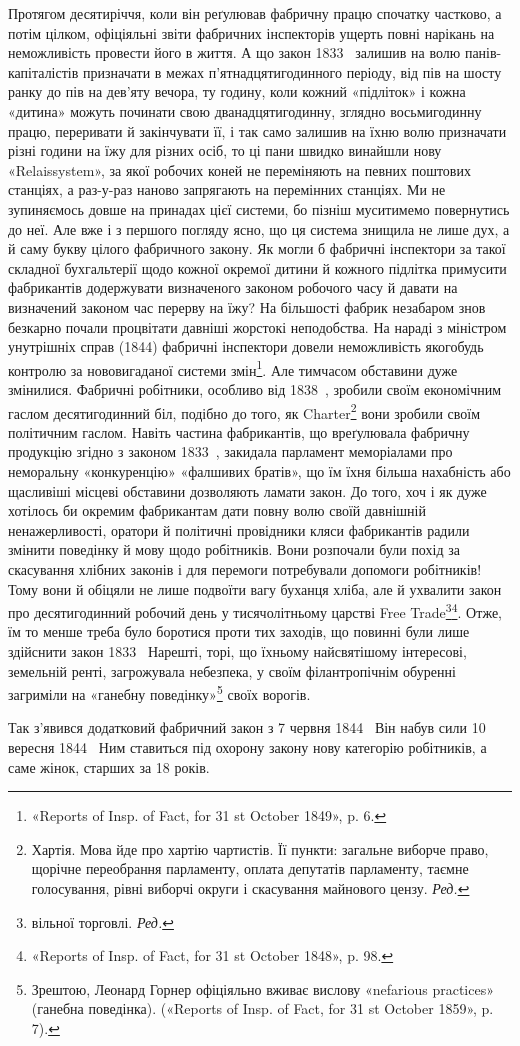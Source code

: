 Протягом десятиріччя, коли він реґулював фабричну працю
спочатку частково, а потім цілком, офіціяльні звіти фабричних
інспекторів ущерть повні нарікань на неможливість провести його
в життя. А що закон 1833~ залишив на волю панів-капіталістів
призначати в межах п’ятнадцятигодинного періоду, від пів на шосту
ранку до пів на дев’яту вечора, ту годину, коли кожний «підліток»
і кожна «дитина» можуть починати свою дванадцятигодинну,
зглядно восьмигодинну працю, переривати й закінчувати
її, і так само залишив на їхню волю призначати різні години
на їжу для різних осіб, то ці пани швидко винайшли нову
«Relaissystem», за якої робочих коней не переміняють на певних
поштових станціях, а раз-у-раз наново запрягають на перемінних
станціях. Ми не зупиняємось довше на принадах цієї
системи, бо пізніш муситимемо повернутись до неї. Але вже і з
першого погляду ясно, що ця система знищила не лише дух, а й
саму букву цілого фабричного закону. Як могли б фабричні
інспектори за такої складної бухгальтерії щодо кожної окремої
дитини й кожного підлітка примусити фабрикантів додержувати
визначеного законом робочого часу й давати на визначений законом
час перерву на їжу? На більшості фабрик незабаром знов
безкарно почали процвітати давніші жорстокі неподобства.
На нараді з міністром унутрішніх справ (1844) фабричні інспектори
довели неможливість якогобудь контролю за нововигаданої
системи змін\footnote{
«Reports of Insp. of Fact, for 31 st October 1849», p. 6.
}. Але тимчасом обставини дуже змінилися. Фабричні
робітники, особливо від 1838~, зробили своїм економічним гаслом
десятигодинний біл, подібно до того, як Charter\footnote*{
Хартія. Мова йде про хартію чартистів. Її пункти: загальне виборче
право, щорічне переобрання парламенту, оплата депутатів парламенту,
таємне голосування, рівні виборчі округи і скасування майнового
цензу. \emph{Ред.}
} вони зробили своїм
політичним гаслом. Навіть частина фабрикантів, що вреґулювала
фабричну продукцію згідно з законом 1833~, закидала парламент
меморіалами про неморальну «конкуренцію» «фалшивих братів»,
що їм їхня більша нахабність або щасливіші місцеві обставини
дозволяють ламати закон. До того, хоч і як дуже хотілось би
окремим фабрикантам дати повну волю своїй давнішній ненажерливості,
оратори й політичні провідники кляси фабрикантів радили
змінити поведінку й мову щодо робітників. Вони розпочали
були похід за скасування хлібних законів і для перемоги потребували
допомоги робітників! Тому вони й обіцяли не лише подвоїти
вагу буханця хліба, але й ухвалити закон про десятигодинний
робочий день у тисячолітньому царстві Free Trade\footnote*{
вільної торговлі. \emph{Ред.}
}\footnote{
«Reports of Insp. of Fact, for 31 st October 1848», p. 98.
}. Отже, їм то менше треба було боротися проти тих заходів, що
повинні були лише здійснити закон 1833~ Нарешті, торі, що їхньому
найсвятішому інтересові, земельній ренті, загрожувала
небезпека, у своїм філантропічнім обуренні загриміли на «ганебну
поведінку»\footnote{
Зрештою, Леонард Горнер офіціяльно вживає вислову «nefarious
practices» (ганебна поведінка). («Reports of Insp. of Fact, for 31 st
October 1859», p. 7).
} своїх ворогів.

Так з’явився додатковий фабричний закон з 7 червня 1844~
Він набув сили 10 вересня 1844~ Ним ставиться під охорону закону
нову категорію робітників, а саме жінок, старших за 18 років.
\parbreak{}  %
